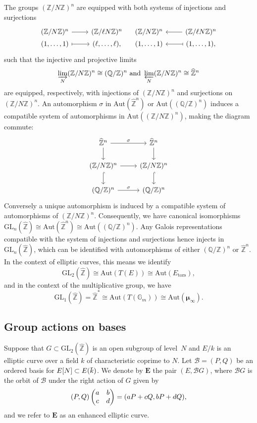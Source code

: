 \documentclass{amsart}
\newcommand{\cB}{\mathcal{B}}
\newcommand{\EE}{\mathbf{E}}
\newcommand{\GG}{\mathbb{G}}
\newcommand{\QQ}{\mathbb{Q}}
\newcommand{\ZZ}{\mathbb{Z}}
\newcommand{\ZZhat}{\widehat{\ZZ}}
\newcommand{\GL}{\mathrm{GL}}
\newcommand{\Aut}{\mathrm{Aut}}
\newcommand{\isom}{\cong}
\newcommand{\overbar}[1]{\mkern 2.0mu\overline{\mkern-2.0mu#1\mkern-2.0mu}\mkern 2.0mu}
\newcommand{\kbar}{\overbar{\smash{k}\vphantom{t}}}
\newcommand{\Group}{G}
\newcommand{\tors}{\mathrm{tors}}
\newcommand{\mmu}{\boldsymbol{\mu}}
\begin{document}
The groups $(\ZZ/N\ZZ)^n$ are equipped with both systems of injections and surjections
$$
\begin{tikzcd}[row sep=0pt]
  (\ZZ/N\ZZ)^n \arrow[r] & (\ZZ/\ell{N}\ZZ)^n\\
  (1,\dots,1) \arrow[r,mapsto] & (\ell,\dots,\ell),
\end{tikzcd}
\quad
\begin{tikzcd}[row sep=0pt]
  (\ZZ/N\ZZ)^n & \arrow[l] (\ZZ/\ell{N}\ZZ)^n\\
  (1,\dots,1)  & \arrow[l,mapsto] (1,\dots,1),
\end{tikzcd}
$$
such that the injective and projective limits 
$$
\varinjlim_N (\ZZ/N\ZZ)^n \isom (\QQ/\ZZ)^n \mbox{ and }
\varprojlim_N (\ZZ/N\ZZ)^n \isom \ZZhat^n
$$
are equipped, respectively, with injections of  $(\ZZ/N\ZZ)^n$ and surjections on $(\ZZ/N\ZZ)^n$.
An automorphism $\sigma$ in $\Aut(\ZZhat^n)$ or $\Aut((\QQ/\ZZ)^n)$ induces a
compatible system of automorphisms in $\Aut((\ZZ/N\ZZ)^n)$, making the
diagram commute:
$$
\begin{tikzcd}
  \ZZhat^n \arrow[d] \arrow[r,"\sigma"] &  \ZZhat^n \arrow[d]\\
  (\ZZ/N\ZZ)^n \arrow[d,hook] \arrow[r] &  (\ZZ/N\ZZ)^n \arrow[d,hook]\\
  (\QQ/\ZZ)^n \arrow[r,"\sigma"] &   (\QQ/\ZZ)^n
\end{tikzcd}
$$
Conversely a unique automorphism is induced by a compatible system of automorphisms
of $(\ZZ/N\ZZ)^n$. Consequently, we have canonical isomorphisms
$
\GL_n(\ZZhat) \isom
\Aut(\ZZhat^n) \isom 
\Aut((\QQ/\ZZ)^n)$.  Any Galois representations compatible with the
system of injections and surjections hence injects in $\GL_n(\ZZhat)$,
which can be identified with automorphisms of either $(\QQ/\ZZ)^n$ or
$\ZZhat^n$.  In the context of elliptic curves, this means we identify
$$
\GL_2(\ZZhat) \isom \Aut(T(E)) \isom \Aut(E_\tors),
$$
and in the context of the multiplicative group, we have
$$
\GL_1(\ZZhat) = \ZZhat^* \isom \Aut(T(\GG_m)) \isom \Aut(\mmu_\infty).
$$

\subsection*{Group actions on bases}

Suppose that $\Group \subset \GL_2(\ZZhat)$ is an open subgroup of
level~$N$ and $E/k$ is an elliptic curve over a field $k$ of characteristic
coprime to $N$. Let $\cB = (P,Q)$ be an ordered basis for $E[N] \subset E(\kbar)$.
We denote by $\EE$ the pair $(E,\cB\Group)$, where $\cB\Group$ is
the orbit of $\cB$ under the right action of $\Group$ given by
$$
(P,Q)\left(\begin{array}{@{}cc@{}}a&b\\c&d\end{array}\right) = (aP+cQ,bP+dQ),
$$
and we refer to $\EE$ as an enhanced elliptic curve.
  
\end{document}
